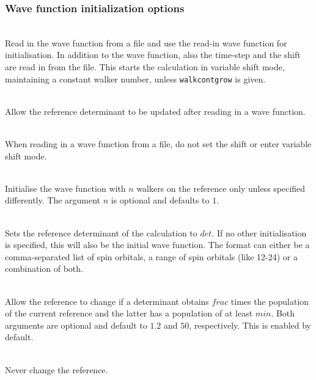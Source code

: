 \documentclass[a4paper,notitlepage]{scrreprt}
\newcommand\codeitem[1]{\needspace{1.5\baselineskip}\item[\textnormal{\ttfamily #1 \nopagebreak}] \hfill \\ \nopagebreak}
\begin{document}
  \subsubsection{Wave function initialization options}
  \begin{description}
    \codeitem{readpops}
    Read in the wave function from a file and use the read-in wave function
    for initialisation. In addition to the wave function, also the time-step
    and the shift are read in from the file. This starts the calculation in
    variable shift mode, maintaining a constant walker number, unless
    \texttt{walkcontgrow} is given.
    \codeitem{readpops-changeref}
    Allow the reference determinant to be updated after reading in a
    wave function.
    \codeitem{walkcontgrow}
    When reading in a wave function from a file, do not set the shift or enter
    variable shift mode.
    \codeitem{startinglepart $n$}
    Initialise the wave function with $n$ walkers on the reference only unless
    specified differently. The argument $n$ is optional and defaults to $1$.
    \codeitem{definedet $det$}
    Sets the reference determinant of the calculation to $det$. If no other
    initialisation is specified, this will also be the initial
    wave function. The format can either be a comma-separated list of spin
    orbitals, a range of spin orbitals (like 12-24) or a combination of both.
    \codeitem{proje-changref $frac$ $min$}
    Allow the reference to change if a determinant obtains $frac$ times the
    population of the current reference and the latter has a population of at
    least $min$. Both arguments are optional and default to $1.2$ and $50$,
    respectively. This is enabled by default.
    \codeitem{no-changeref}
    Never change the reference.
  \end{description}
\end{document}
